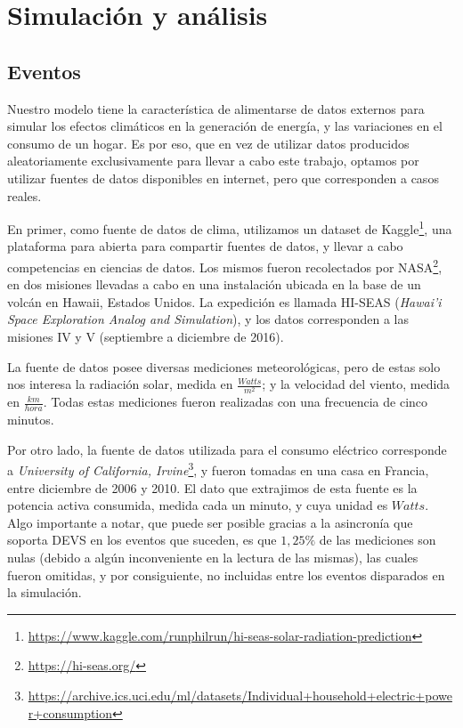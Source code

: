 
\section{Simulación y análisis}

\subsection{Eventos}
Nuestro modelo tiene la característica de alimentarse de
datos externos para simular los efectos climáticos en la generación de
energía, y las variaciones en el consumo de un hogar. Es por eso, que en vez
de utilizar datos producidos aleatoriamente exclusivamente para llevar a cabo
este trabajo, optamos por utilizar fuentes de datos disponibles en internet,
pero que corresponden a casos reales.

En primer, como fuente de datos de clima, utilizamos un dataset de
Kaggle\footnote{\url{https://www.kaggle.com/runphilrun/hi-seas-solar-radiation-prediction}},
una plataforma para abierta para compartir fuentes de datos, y llevar a cabo
competencias en ciencias de datos. Los mismos fueron recolectados por
NASA\footnote{\url{https://hi-seas.org/}}, en dos misiones llevadas a cabo en
una instalación ubicada en la base de un volcán en Hawaii, Estados Unidos. La
expedición es llamada HI-SEAS (\textit{Hawai’i Space Exploration Analog and
Simulation}), y los datos corresponden a las misiones IV y V (septiembre a
diciembre de 2016).

La fuente de datos posee diversas mediciones meteorológicas, pero de estas
solo nos interesa la radiación solar, medida en $\frac{Watts}{m^2}$; y la
velocidad del viento, medida en $\frac{km}{hora}$. Todas estas mediciones
fueron realizadas con una frecuencia de cinco minutos.

Por otro lado, la fuente de datos utilizada para el consumo eléctrico
corresponde a \textit{University of California,
Irvine}\footnote{\url{https://archive.ics.uci.edu/ml/datasets/Individual+household+electric+power+consumption}},
y fueron tomadas en una casa en Francia, entre diciembre de 2006 y 2010. El
dato que extrajimos de esta fuente es la potencia activa consumida, medida
cada un minuto, y cuya unidad es $Watts$. Algo importante a notar, que puede
ser posible gracias a la asincronía que soporta DEVS en los eventos que
suceden, es que $1,25\%$ de las mediciones son nulas (debido a algún
inconveniente en la lectura de las mismas), las cuales fueron omitidas, y por
consiguiente, no incluidas entre los eventos disparados en la simulación.

